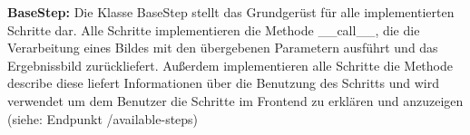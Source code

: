\textbf{BaseStep:} Die Klasse \glqq BaseStep\grqq{} stellt das Grundgerüst für alle implementierten Schritte dar. Alle Schritte implementieren die Methode \glqq \_\_call\_\_\grqq{}, die die Verarbeitung eines Bildes mit den übergebenen Parametern ausführt und das Ergebnissbild zurückliefert. Außerdem implementieren alle Schritte die Methode \glqq describe\grqq{}  diese liefert Informationen über die Benutzung des Schritts und wird verwendet um dem Benutzer die Schritte im Frontend zu erklären und anzuzeigen (siehe: Endpunkt \glqq/available-steps\grqq{})